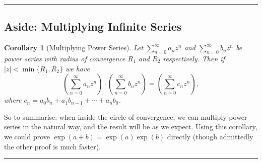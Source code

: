 \documentclass[11pt, a4paper]{article}
\newtheorem*{lemma*}{Lemma}
\newtheorem*{corollary*}{Corollary}
\theoremstyle{definition}
\newenvironment{aside}[1]{
	\noindent
    \rule{\textwidth}{0.025cm}
    \vspace{-1.75\baselineskip}
    \subsection*{#1}}
{\noindent\rule{\textwidth}{0.025cm}}
\newcommand{\C}{\mathbb{C}}
\begin{document}
\begin{aside}{Aside: Multiplying Infinite Series}
\begin{corollary*}[Multiplying Power Series]
	Let $\sum_{n = 0}^{\infty} a_n z^n$ and $\sum_{n = 0}^{\infty} b_n z^n$ be power series with radius of convergence $R_1$ and $R_2$ respectively. Then if $|z| < \min\{R_1, R_2\}$ we have
	$$
	\left(\sum_{n = 0}^{\infty} a_n z^n\right) \cdot \left(\sum_{n = 0}^{\infty} b_n z^n\right) = \left(\sum_{n = 0}^{\infty} c_n z^n\right),
	$$
	where $c_n = a_0 b_n + a_1 b_{n - 1} + \cdots + a_n b_0$.
\end{corollary*}

So to summarise: when inside the circle of convergence, we can multiply power series in the natural way, and the result will be as we expect. Using this corollary, we could prove $\exp(a + b) = \exp(a) \exp(b)$ directly (though admittedly the other proof is much faster).





\end{aside}
\end{document}
